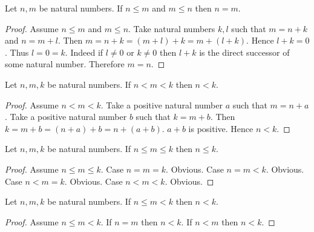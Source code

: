 \documentclass[10pt]{article}
\begin{document}
  \begin{forthel}
    \begin{proposition}[id=ARITHMETIC_04_4190604718243840,printid]
      Let $n, m$ be natural numbers.
      If $n \leq m$ and $m \leq n$ then $n = m$.
    \end{proposition}
    \begin{proof}
      Assume $n \leq m$ and $m \leq n$.
      Take natural numbers $k, l$ such that $m = n + k$ and $n = m + l$.
      Then $m
        = n + k
        = (m + l) + k
        = m + (l + k)$.
      Hence $l + k = 0$.
      Thus $l = 0 = k$.
      Indeed if $l \neq 0$ or $k \neq 0$ then $l + k$ is the direct successor of
      some natural number.
      Therefore $m = n$.
    \end{proof}
  \end{forthel}

  \begin{forthel}
    \begin{proposition}[id=ARITHMETIC_04_6413905244979200,printid]
      Let $n, m, k$ be natural numbers.
      If $n < m < k$ then $n < k$.
    \end{proposition}
    \begin{proof}
      Assume $n < m < k$.
      Take a positive natural number $a$ such that $m = n + a$.
      Take a positive natural number $b$ such that $k = m + b$.
      Then $k
        = m + b
        = (n + a) + b
        = n + (a + b)$.
      $a + b$ is positive.
      Hence $n < k$.
    \end{proof}
  \end{forthel}

  \begin{forthel}
    \begin{proposition}[id=ARITHMETIC_04_5480385953660928,printid]
      Let $n, m, k$ be natural numbers.
      If $n \leq m \leq k$ then $n \leq k$.
    \end{proposition}
    \begin{proof}
      Assume $n \leq m \leq k$.
      Case $n = m = k$. Obvious.
      Case $n = m < k$. Obvious.
      Case $n < m = k$. Obvious.
      Case $n < m < k$. Obvious.
    \end{proof}
  \end{forthel}

  \begin{forthel}
    \begin{proposition}[id=ARITHMETIC_04_5098403656630272,printid]
      Let $n, m, k$ be natural numbers.
      If $n \leq m < k$ then $n < k$.
    \end{proposition}
    \begin{proof}
      Assume $n \leq m < k$.
      If $n = m$ then $n < k$.
      If $n < m$ then $n < k$.
    \end{proof}
  \end{forthel}
\end{document}
